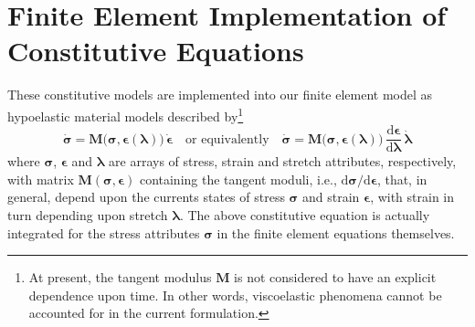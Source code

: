 \section{Finite Element Implementation of Constitutive Equations}
\label{secFE_CE}

These constitutive models are implemented into our finite element model as hypo\-elastic material models \cite{Truesdell55} described by\footnote{
    At present, the tangent modulus $\boldsymbol{M}$ is not considered to have an explicit dependence upon time.  In other words, visco\-elastic phenomena cannot be accounted for in the current formulation.
}
\begin{equation}
\dot{\boldsymbol{\sigma}} = \mathbf{M} \bigl( \boldsymbol{\sigma}, \boldsymbol{\epsilon} ( \boldsymbol{\lambda} ) \bigr) \, \dot{\boldsymbol{\epsilon}} 
\quad \text{or equivalently} \quad
\dot{\boldsymbol{\sigma}} = 
\mathbf{M} \bigl( \boldsymbol{\sigma} , \boldsymbol{\epsilon} ( \boldsymbol{\lambda} ) \bigr) \, \frac{\mathrm{d} \boldsymbol{\epsilon}}
{\mathrm{d} \boldsymbol{\lambda}} \, \dot{\boldsymbol{\lambda}}
\end{equation}
where $\boldsymbol{\sigma}$, $\boldsymbol{\epsilon}$ and $\boldsymbol{\lambda}$ are arrays of stress, strain and stretch attributes, respectively, with matrix $\mathbf{M} ( \boldsymbol{\sigma}, \boldsymbol{\epsilon} )$ containing the tangent moduli, i.e., $\mathrm{d} \boldsymbol{\sigma} / \mathrm{d} \boldsymbol{\epsilon}$, that, in general, depend upon the currents states of stress $\boldsymbol{\sigma}$ and strain $\boldsymbol{\epsilon}$, with strain in turn depending upon stretch $\boldsymbol{\lambda}$.  The above constitutive equation is actually integrated for the stress attributes $\boldsymbol{\sigma}$ in the finite element equations themselves.


